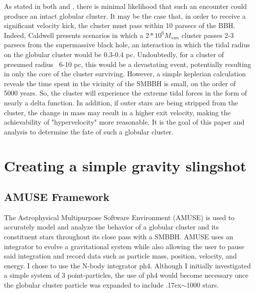 \documentclass{aastex62}
\begin{document}
As stated in both \citet{cald14} and \citet{sam15}, there is minimal likelihood that such an encounter could produce an intact globular cluster. It may be the case that, in order to receive a significant velocity kick, the cluster must pass within 10 parsecs of the BBH. Indeed, Caldwell presents scenarios in which a $2*10^6M_{sun}$ cluster passes 2-3 parsecs from the supermassive black hole, an interaction in which the tidal radius on the globular cluster would be 0.3-0.4 pc. Undoubtedly, for a cluster of presumed radius ~6-10 pc, this would be a devastating event, potentially resulting in only the core of the cluster surviving. However, a simple keplerian calculation reveals the time spent in the vicinity of the SMBBH is small, on the order of 5000 years. So, the cluster will experience the extreme tidal forces in the form of nearly a delta function. In addition, if outer stars are being stripped from the cluster, the change in mass may result in a higher exit velocity, making the achievability of "hypervelocity" more reasonable. It is the goal of this paper and analysis to determine the fate of such a globular cluster. 

\section{Creating a simple gravity slingshot}
\subsection{AMUSE Framework}
The Astrophysical Multipurpose Software Environment (AMUSE) is used to accurately model and analyze the behavior of a globular cluster and its constituent stars throughout its close pass with a SMBBH. AMUSE uses an integrator to evolve a gravitational system while also allowing the user to pause said integration and record data such as particle mass, position, velocity, and energy. I chose to use the N-body integrator ph4. Although I initially investigated a simple system of 3 point-particles, the use of ph4 would become necessary once the globular cluster particle was expanded to include {\raise.17ex\hbox{$\scriptstyle\mathtt{\sim}$}}1000 stars. 
\end{document}
